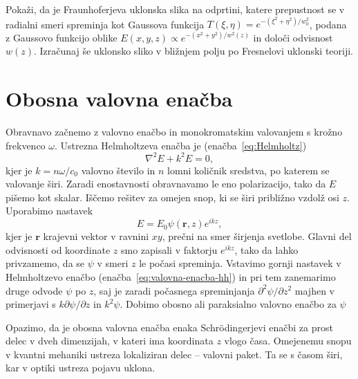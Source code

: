\begin{definition}
\label{ffuklon}
Pokaži, da je Fraunhoferjeva uklonska slika na odprtini, katere prepustnost se v radialni smeri
spreminja kot Gaussova funkcija $T(\xi, \eta)=e^{-(\xi^2+\eta^2)/w_0^2}$, podana z Gaussovo funkcijo
oblike $E(x,y,z) \propto e^{-(x^2+y^2)/w^2(z)}$ in določi odvisnost $w(z)$. Izračunaj še 
uklonsko sliko v bližnjem polju po Fresnelovi uklonski teoriji.
\end{definition}

\section{Obosna valovna enačba}
Obravnavo začnemo z valovno enačbo in monokromatskim valovanjem s krožno frekvenco $\omega$. Ustrezna
Helmholtzeva enačba je (enačba~\ref{eq:Helmholtz})
\begin{equation}
\nabla^{2}E+k^{2}E=0,
\label{eq:valovna-enacba-hh}
\end{equation}
kjer je $k=n\omega/c_{0}$ valovno število in $n$ lomni količnik
sredstva, po katerem se valovanje širi. Zaradi enostavnosti obravnavamo
le eno polarizacijo, tako da $E$ pišemo kot skalar. Iščemo rešitev za
omejen snop, ki se širi približno vzdolž osi $z$. Uporabimo nastavek
\begin{equation}
E=E_{0}\psi(\mathbf{r},z)e^{ikz},
\label{eq:ravni-val-nastavek}
\end{equation}
kjer je $\mathbf{r}$ krajevni vektor v ravnini $xy$, prečni na smer širjenja svetlobe. 
Glavni del odvisnosti od koordinate $z$ smo zapisali v faktorju $e^{ikz}$, tako da lahko
privzamemo, da se $\psi$ v smeri $z$ le počasi spreminja. Vstavimo
gornji nastavek v Helmholtzevo enačbo (enačba~\ref{eq:valovna-enacba-hh})
in pri tem zanemarimo druge odvode $\psi$ po $z$, saj je zaradi počasnega spreminjanja
$\partial^{2}\psi/\partial z^{2}$ majhen v primerjavi s $k\partial\psi/\partial z$ in $k^{2}\psi$.
Dobimo obosno
ali paraksialno valovno enačbo za $\psi$
\begin{remark} 
Opazimo, da je obosna valovna enačba enaka Schr\"{o}dingerjevi enačbi
za prost delec v dveh dimenzijah, v kateri ima koordinata $z$ vlogo
časa. Omejenemu snopu v kvantni mehaniki ustreza lokaliziran delec
-- valovni paket. Ta se s časom širi, kar v optiki ustreza pojavu uklona.
\end{remark}
